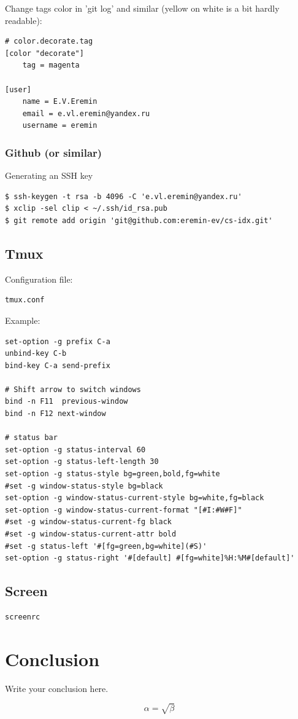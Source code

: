 \documentclass[12pt,a4paper]{article}
\begin{document}
Change tags color in 'git log' and similar (yellow on white is a bit hardly 
readable):
\begin{verbatim}
# color.decorate.tag
[color "decorate"]
    tag = magenta

[user]
    name = E.V.Eremin
    email = e.vl.eremin@yandex.ru
    username = eremin
\end{verbatim}

\subsubsection{Github (or similar)}

Generating an SSH key

\begin{verbatim}
$ ssh-keygen -t rsa -b 4096 -C 'e.vl.eremin@yandex.ru'
$ xclip -sel clip < ~/.ssh/id_rsa.pub
$ git remote add origin 'git@github.com:eremin-ev/cs-idx.git'
\end{verbatim}

\subsection{Tmux}

Configuration file:

\begin{verbatim}
tmux.conf
\end{verbatim}

Example:

\begin{verbatim}
set-option -g prefix C-a
unbind-key C-b
bind-key C-a send-prefix

# Shift arrow to switch windows
bind -n F11  previous-window
bind -n F12 next-window

# status bar
set-option -g status-interval 60
set-option -g status-left-length 30
set-option -g status-style bg=green,bold,fg=white
#set -g window-status-style bg=black
set-option -g window-status-current-style bg=white,fg=black
set-option -g window-status-current-format "[#I:#W#F]"
#set -g window-status-current-fg black
#set -g window-status-current-attr bold
#set -g status-left '#[fg=green,bg=white](#S)'
set-option -g status-right '#[default] #[fg=white]%H:%M#[default]'
\end{verbatim}

\subsection{Screen}

\begin{verbatim}
screenrc
\end{verbatim}

\section{Conclusion}

Write your conclusion here.

\begin{equation}
    \label{simple_equation}
    \alpha = \sqrt{\beta}
\end{equation}
\end{document}
